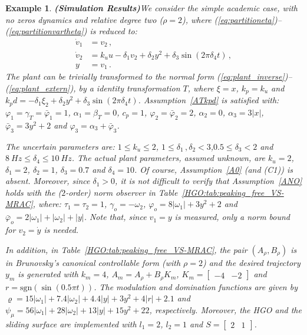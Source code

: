 \documentclass{rncauth}
\newtheorem{example}{Example}
\begin{document}
\begin{example} \emph{\textbf{(Simulation
Results)}}\label{sec:simulation} We consider the simple academic
case, with no zeros dynamics and relative degree two
($\rho\!=\!2$), where
(\ref{eq:partitioneta})--(\ref{eq:partitionvartheta}) is reduced
to:
%
\begin{align}
\dot{v}_1&=v_2\,, \nonumber \\
\dot{v}_2&=k_u u -\delta_1 v_2+\delta_2 y^2 +\delta_3\sin(2 \pi
\delta_{4} t)\,, \nonumber\\
y&=v_1\,. \nonumber
\end{align}
%
The plant can be trivially transformed to the normal form
(\ref{eq:plant_inverse})--(\ref{eq:plant_extern}), by a identity
transformation $T$, where $\xi=x$, $k_p=k_u$ and $k_p d=-\delta_1
\xi_2+\delta_2 y^2 +\delta_3\sin(2 \pi \delta_{4} t)$.
Assumption~\ref{ATkpd} is satisfied with:
$\varphi_1=\gamma_T=\bar{\varphi}_1=1$, $\alpha_1=\beta_T=0$,
$c_p=1$, $\varphi_2=\bar{\varphi}_2=2$, $\alpha_2=0$,
$\alpha_3=3|x|$, $\bar{\varphi}_3=3y^2+2$ and
$\varphi_3=\alpha_3+\bar{\varphi}_3$.

The uncertain parameters are: $1\!\leq\!k_u\!\leq\!2$,
$1\!\leq\!\delta_1\,,\delta_2\!<\!3$,$0.5\!\leq\!\delta_3\!<\!2$
and $\!8~Hz\leq\!\delta_{4}\!\leq\!10~Hz$. The {\em actual} plant
parameters, assumed unknown, are $k_u\!=\!2$, $\delta_1\!=\!2$,
$\delta_2\!=\!1$, $\delta_3\!=\!0.7$ and $\delta_4\!=\!10$. Of
course, Assumption~\ref{A0} (and (C1)) is absent. Moreover, since
$\delta_1>0$, it is not difficult to verify that
Assumption~\ref{ANO} holds with the ($2$-order) norm observer in
Table~\ref{HGO:tab:peaking_free_VS-MRAC}, where:
$\tau_1=\tau_2=1$, $\gamma_o=-\omega_2$,
$\varphi_o=8|\omega_1|+3y^2+2$ and
$\bar{\varphi}_o=2|\omega_1|+|\omega_2|+|y|$. Note that, since
$v_1=y$ is measured, only a norm bound for $v_2=\dot{y}$ is
needed.

In addition, in Table~\ref{HGO:tab:peaking_free_VS-MRAC}, the pair
$(A_\rho,B_\rho)$ is in Brunovsky's canonical controllable form
(with $\rho=2$) and the desired trajectory $y_m$ is generated with
$k_m=4$, $A_m=A_\rho+B_\rho K_m$, $K_m=[\begin{array}{cc}-4 &
-2\end{array}]$ and $r=\mbox{sgn}(\sin(0.5\pi t))$. The modulation
and domination functions are given
by %
$\varrho=15|\omega_1|+7.4|\omega_2|+4.4|y|+3y^2+4|r|+2.1$
and $\psi_\mu=56|\omega_1|+28|\omega_2|+13|y|+15y^2+22$,
respectively. Moreover, the HGO and the sliding surface are
implemented with $l_1=2$, $l_2=1$ and $S=[\begin{array}{cc}2 &
1\end{array}]$.


\end{example}
\end{document}
